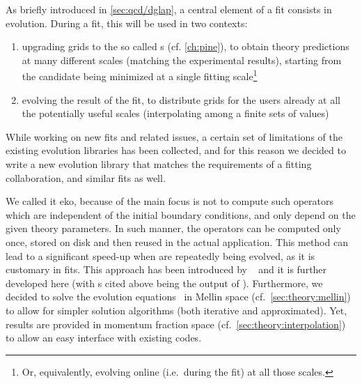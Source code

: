 
As briefly introduced in \cref{sec:qcd/dglap}, a central element of a \pdf fit
consists in \dglap evolution.
%
During a fit, this will be used in two contexts: 
\begin{enumerate}[label=\roman*.]
  \item upgrading grids to the so called \fktab{}s (cf. \cref{ch:pine}), to
    obtain theory predictions at many different scales (matching the
    experimental results), starting from the \pdf candidate being minimized at
    a single fitting scale\footnote{
      Or, equivalently, evolving online (i.e.\ during the fit) at all those scales.
    }
  \item evolving the result of the fit, to distribute \pdf grids for the users
    already at all the potentially useful scales (interpolating among a finite
    sets of values)
\end{enumerate}

While working on new \pdf fits and related issues, a certain set of limitations
of the existing \dglap evolution libraries has been collected, and for this
reason we decided to write a new \qcd{} evolution library that matches the
requirements of a \pdf fitting collaboration, and similar fits as well.

We called it \acrfull{eko}, because of the main focus is not to compute such
operators which are independent of the initial boundary conditions, and only
depend on the given theory parameters.
In such manner, the operators can be computed only once, stored on disk and
then reused in the actual application. This method can lead to a significant
speed-up when \pdfs are repeatedly being evolved, as it is customary in \pdf{}
fits.
This approach has been introduced by
\fk~\cite{Ball:2008by,Ball:2010de,DelDebbio:2007ee} and it is further developed
here (with \fktab{}s cited above being the output of \fk).
%
Furthermore, we decided to solve the evolution equations~ in Mellin space (cf.\
\cref{sec:theory:mellin}) to allow for simpler solution algorithms (both
iterative and approximated).
Yet, results are provided in momentum fraction space (cf.\
\cref{sec:theory:interpolation}) to allow an easy interface with existing
codes.

